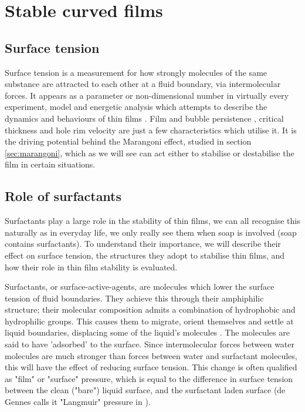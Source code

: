\documentclass[a4paper,12pt]{article}
\numberwithin{equation}{section}
\numberwithin{figure}{section}
\numberwithin{table}{section}
\begin{document}
\newpage
\section{Stable curved films}
\subsection{Surface tension}
Surface tension is a measurement for how strongly molecules of the same substance are attracted to each other at a fluid boundary, via intermolecular forces. It appears as a parameter or non-dimensional number in virtually every experiment, model and energetic analysis which attempts to describe the dynamics and behaviours of thin films \cite{Ida1998}. Film and bubble persistence \cite{Modini2013}, critical thickness \cite{Manev1974, Lhuissier2011} and hole rim velocity \cite{Culick1960} are just a few characteristics which utilise it. It is the driving potential behind the Marangoni effect, studied in section \ref{sec:marangoni}, which as we will see can act either to stabilise or destabilise the film in certain situations.


\subsection{Role of surfactants}
Surfactants play a large role in the stability of thin films, we can all recognise this naturally as in everyday life, we only really see them when soap is involved (soap contains surfactants). To understand their importance, we will describe their effect on surface tension, the structures they adopt to stabilise thin films, and how their role in thin film stability is evaluated.

Surfactants, or surface-active-agents, are molecules which lower the surface tension of fluid boundaries. They achieve this through their amphiphilic structure; their molecular composition admits a combination of hydrophobic and hydrophilic groups. This causes them to migrate, orient themselves and settle at liquid boundaries, displacing some of the liquid's molecules \cite{Gast1997}. The molecules are said to have 'adsorbed' to the surface. Since intermolecular forces between water molecules are much stronger than forces between water and surfactant molecules, this will have the effect of reducing surface tension. This change is often qualified as "film" or "surface" pressure, which is equal to the difference in surface tension between the clean ("bare") liquid surface, and the surfactant laden surface \cite{Bhamla2017} (de Gennes calls it "Langmuir" pressure in \cite{deGennesYoung2001}).  %
\end{document}
